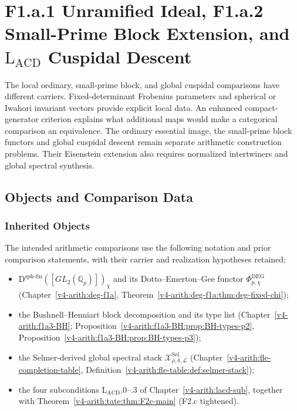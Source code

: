 \chapter{F1.a.1 Unramified Ideal, F1.a.2 Small-Prime Block Extension, and \(\mathrm{L}_{\mathrm{ACD}}\) Cuspidal Descent}
\label{v4-arith:w5-e:chapter}

The local ordinary, small-prime block, and global cuspidal comparisons
have different carriers. Fixed-determinant Frobenius parameters and
spherical or Iwahori invariant vectors provide explicit local data.
An enhanced compact-generator criterion explains what additional maps
would make a categorical comparison an equivalence. The ordinary
essential image, the small-prime block functors and global cuspidal
descent remain separate arithmetic construction problems. Their
Eisenstein extension also requires normalized intertwiners and global
spectral synthesis.

\section{Objects and Comparison Data}
\label{v4-arith:w5-e:domain}

\subsection{Inherited Objects}

The intended arithmetic comparisons use the following notation and prior comparison statements, with their carrier and realization hypotheses retained:
\begin{itemize}
\item \(\mathrm{D}^{\mathrm{sph\text{-}fin}}([GL_{2}(\mathbb{Q}_{p})])_{\chi}\)
and its Dotto--Emerton--Gee functor
\(\Phi^{\mathrm{DEG}}_{p,\chi}\) (Chapter~\ref{v4-arith:deg-f1a},
Theorem~\ref{v4-arith:deg-f1a:thm:deg-fixed-chi});
\item the Bushnell--Henniart block decomposition and its type
list (Chapter~\ref{v4-arith:f1a3-BH};
Proposition~\ref{v4-arith:f1a3-BH:prop:BH-types-p2},
Proposition~\ref{v4-arith:f1a3-BH:prop:BH-types-p3});
\item the Selmer-derived global spectral stack
\(\mathcal{X}^{\mathrm{Sel}}_{\bar\rho,\delta,\mathcal{L}}\)
(Chapter~\ref{v4-arith:fle-completion-table},
Definition~\ref{v4-arith:fle-table:def:selmer-stack});
\item the four subconditions
\(\mathrm{L}_{\mathrm{ACD}}\).0--.3 of
Chapter~\ref{v4-arith:lacd-sub}, together with
Theorem~\ref{v4-arith:tate:thm:F2c-main} (F2.c tightened).
\end{itemize}

